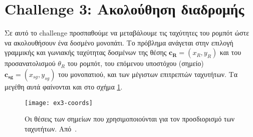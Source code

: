 \section{Challenge 3: Ακολούθηση διαδρομής}\label{section:ex3}
Σε αυτό το challenge προσπαθούμε να μεταβάλουμε τις ταχύτητες του ρομπότ ώστε να ακολουθήσουν ένα δοσμένο μονοπάτι.
Το πρόβλημα ανάγεται στην επιλογή γραμμικής και γωνιακής ταχύτητας δοσμένων της
θέσης $\mathbf{c_R} = \left(x_R, y_R\right)$ και του προσανατολισμού $\theta_R$ του ρομπότ, του επόμενου υποστόχου (σημείο) $\mathbf{c_{sg}} = \left(x_{sg}, y_{sg}\right)$ του μονοπατιού, και των μέγιστων επιτρεπτών ταχυτήτων.
Τα μεγέθη αυτά φαίνονται και στο σχήμα \ref{fig:ex3-coords}.

\begin{figure}[htb]
    \centering
    \texttt{[image: ex3-coords]}
    \caption{Οι θέσεις των σημείων που χρησιμοποιούνται για τον προσδιορισμό των ταχυτήτων. Από~\protect\cite{etsardou-phd}.}\label{fig:ex3-coords}
\end{figure}

